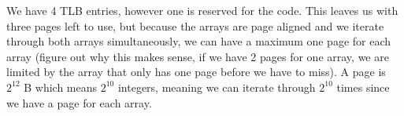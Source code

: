 \begin{blocksection}
\begin{parts}
\begin{solution}[0.5in]
We have 4 TLB entries, however one is reserved for the code. This leaves us with three pages left to use, but because the arrays are page aligned and 
we iterate through both arrays simultaneously, we can have a maximum one page for each array (figure out why this makes sense, if we have 2 pages for one array, we are limited by the array that only has one page before we have to miss). 
A page is $2^{12}$ B which means $2^{10}$ integers, meaning we can iterate through $2^{10}$ times since we have a page for each array.
\end{solution}

\end{parts}

\end{blocksection}